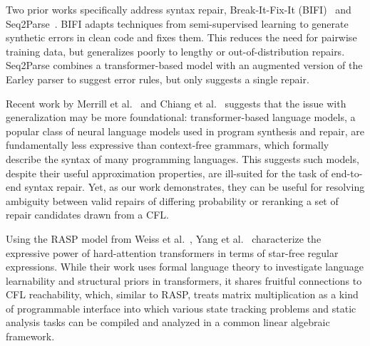 \documentclass[popl.tex]{subfiles}
\begin{document}
Two prior works specifically address syntax repair, Break-It-Fix-It (BIFI)~\cite{yasunaga2021break} and Seq2Parse~\cite{sakkas2022seq2parse}. BIFI adapts techniques from semi-supervised learning to generate synthetic errors in clean code and fixes them. This reduces the need for pairwise training data, but generalizes poorly to lengthy or out-of-distribution repairs. Seq2Parse combines a transformer-based model with an augmented version of the Earley parser to suggest error rules, but only suggests a single repair.

Recent work by Merrill et al.~\cite{merrill2022saturated} and Chiang et al.~\cite{chiang2023tighter} suggests that the issue with generalization may be more foundational: transformer-based language models, a popular class of neural language models used in program synthesis and repair, are fundamentally less expressive than context-free grammars, which formally describe the syntax of many programming languages. This suggests such models, despite their useful approximation properties, are ill-suited for the task of end-to-end syntax repair. Yet, as our work demonstrates, they can be useful for resolving ambiguity between valid repairs of differing probability or reranking a set of repair candidates drawn from a CFL.

Using the RASP model from Weiss et al.~\cite{weiss2021thinking}, Yang et al.~\cite{yang2024masked} characterize the expressive power of hard-attention transformers in terms of star-free regular expressions. While their work uses formal language theory to investigate language learnability and structural priors in transformers, it shares fruitful connections to CFL reachability, which, similar to RASP, treats matrix multiplication as a kind of programmable interface into which various state tracking problems and static analysis tasks can be compiled and analyzed in a common linear algebraic framework.
\ifSubfilesClassLoaded{}{}
\end{document}
